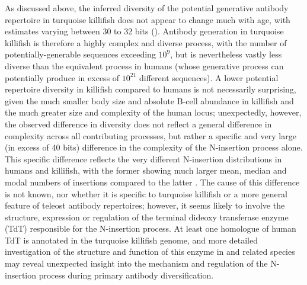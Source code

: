 As discussed above, the inferred diversity of the potential generative antibody repertoire in turquoise killifish does not appear to change much with age, with estimates varying between 30 to 32 bits (). Antibody generation in turquoise killifish is therefore a highly complex and diverse process, with the number of potentially-generable sequences exceeding $10^9$, but is nevertheless  vastly less diverse than the equivalent process in humans (whose generative process can potentially produce in excess of $10^{21}$ different sequences). A lower potential repertoire diversity in killifish compared to humans is not necessarily surprising, given the much smaller body size and absolute B-cell abundance in killifish and the much greater size and complexity of the human \igh{} locus; unexpectedly, however, the observed difference in diversity does not reflect a general difference in complexity across all contributing processes, but rather a specific and very large (in excess of 40 bits) difference in the complexity of the N-insertion process alone. This specific difference reflects the very different N-insertion distributions in humans and killifish, with the former showing much larger mean, median and modal numbers of insertions compared to the latter \parencite{elhanati2015model}. The cause of this difference is not known, nor whether it is specific to turquoise killifish or a more general feature of teleost antibody repertoires; however, it seems likely to involve the structure, expression or regulation of the terminal dideoxy transferase enzyme (TdT) responsible for the N-insertion process. At least one homologue of human TdT is annotated in the turquoise killifish genome, and more detailed investigation of the structure and function of this enzyme in \nfu and related species may reveal unexpected insight into the mechanism and regulation of the N-insertion process during primary antibody diversification.

